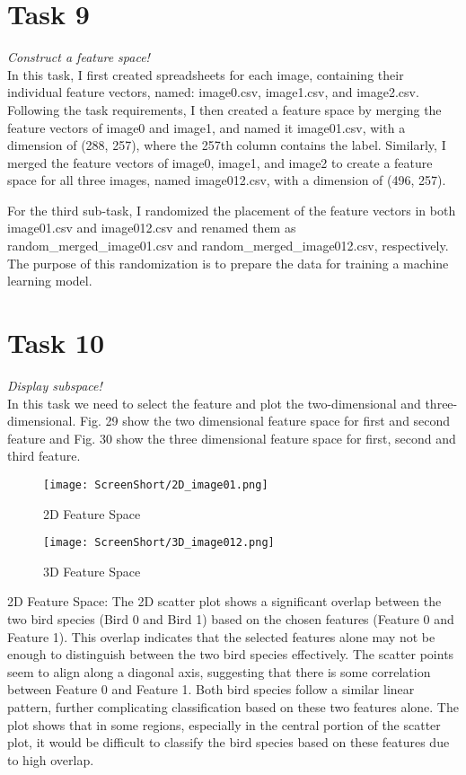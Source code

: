 \documentclass[conference,12pt]{IEEEtran}
\begin{document}
\section{Task 9}
\textit{Construct a feature space!}\\
In this task, I first created spreadsheets for each image, containing their individual feature vectors, named: image0.csv, image1.csv, and image2.csv. Following the task requirements, I then created a feature space by merging the feature vectors of image0 and image1, and named it image01.csv, with a dimension of (288, 257), where the 257th column contains the label. Similarly, I merged the feature vectors of image0, image1, and image2 to create a feature space for all three images, named image012.csv, with a dimension of (496, 257).

For the third sub-task, I randomized the placement of the feature vectors in both image01.csv and image012.csv and renamed them as random\_merged\_image01.csv and random\_merged\_image012.csv, respectively. The purpose of this randomization is to prepare the data for training a machine learning model.

\section{Task 10}
\textit{Display subspace!}\\
In this task we need to select the feature and plot the two-dimensional and three-dimensional. Fig. 29 show the two dimensional feature space for first and second feature and Fig. 30 show the three dimensional feature space for first, second and third feature. 
\begin{figure}[h!]
    \centering
    \texttt{[image: ScreenShort/2D\_image01.png]}
    \caption{2D Feature Space}
\end{figure}

\begin{figure}[h!]
    \centering
    \texttt{[image: ScreenShort/3D\_image012.png]}
    \caption{3D Feature Space}
\end{figure}

2D Feature Space: The 2D scatter plot shows a significant overlap between the two bird species (Bird 0 and Bird 1) based on the chosen features (Feature 0 and Feature 1). This overlap indicates that the selected features alone may not be enough to distinguish between the two bird species effectively.
The scatter points seem to align along a diagonal axis, suggesting that there is some correlation between Feature 0 and Feature 1. Both bird species follow a similar linear pattern, further complicating classification based on these two features alone.
The plot shows that in some regions, especially in the central portion of the scatter plot, it would be difficult to classify the bird species based on these features due to high overlap.
\end{document}
